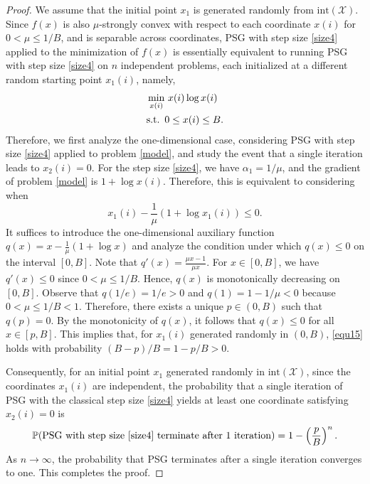 \documentclass[sn-mathphys]{JORSC-jnl}%
\theoremstyle{thmstyleone}%
\theoremstyle{thmstylethree}%
\def\ST{\songti\rm\relax}
\def\ST{{\rm s.t.}}
\begin{document}
\begin{proof}
	We assume that the initial point $x_1$ is generated randomly from $\text{int}(\mathcal{X})$. Since $f(x)$ is also $\mu$-strongly convex with respect to each coordinate $x(i)$ for $0 < \mu \le 1/B$, and is separable across coordinates, PSG with step size \eqref{size4} applied to the minimization of $f(x)$ is essentially equivalent to running PSG with step size \eqref{size4} on $n$ independent problems, each initialized at a different random starting point $x_1(i)$, namely,
	\begin{equation}
		\begin{alignedat}{2}
			&\min_{x(i)} && ~ x(i) \log x(i)\\
			&\ST&&0 \le x(i) \le B.
		\end{alignedat}
		\label{model}
	\end{equation}
	Therefore, we first analyze the one-dimensional case, considering PSG with step size \eqref{size4} applied to problem \eqref{model}, and study the event that a single iteration leads to $x_2(i)=0$. For the step size \eqref{size4}, we have $\alpha_1 = 1/\mu$, and the gradient of problem \eqref{model} is $1 + \log x(i)$. Therefore, this is equivalent to considering when
	\begin{equation}\label{equ15}
		x_1(i) - \frac{1}{\mu}\left(1 + \log x_1(i)\right) \le 0.
	\end{equation}
	It suffices to introduce the one-dimensional auxiliary function $q(x) = x - \frac{1}{\mu}(1+\log x)$ and analyze the condition under which $q(x) \le 0$ on the interval $[0,B]$. Note that $q'(x) = \frac{\mu x - 1}{\mu x}$. For $x \in [0,B]$, we have $q'(x) \le 0$ since $0 < \mu \le 1/B$. Hence, $q(x)$ is monotonically decreasing on $[0,B]$. Observe that $q(1/e) = 1/e > 0$ and $q(1) = 1 - 1/\mu < 0$ because $0 < \mu \le 1/B < 1$. Therefore, there exists a unique $p \in (0,B)$ such that $q(p)=0$. By the monotonicity of $q(x)$, it follows that $q(x) \le 0$ for all $x \in [p,B]$. This implies that, for $x_1(i)$ generated randomly in $(0,B)$, \eqref{equ15} holds with probability $(B-p)/B = 1 - p/B >0$.
	
	Consequently, for an initial point $x_1$ generated randomly in $\text{int}(\mathcal{X})$, since the coordinates $x_1(i)$ are independent, the probability that a single iteration of PSG with the classical step size \eqref{size4} yields at least one coordinate satisfying $x_2(i)=0$ is
	\begin{equation*}
		\mathbb{P}(\text{PSG with step size \eqref{size4} terminate after 1 iteration}) = 1-\left(\frac{p}{B}\right)^n.
	\end{equation*}
	As $n \to \infty$, the probability that PSG terminates after a single iteration converges to one. This completes the proof.
\end{proof}
\end{document}
